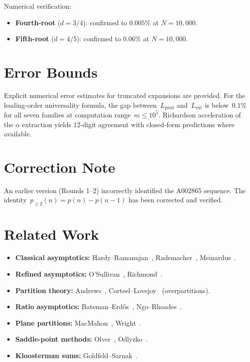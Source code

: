 \documentclass[11pt,a4paper]{article}
\begin{document}
\noindent Numerical verification:
\begin{itemize}
  \item \textbf{Fourth-root} ($d=3/4$): confirmed to $0.005\%$ at $N=10{,}000$.
  \item \textbf{Fifth-root} ($d=4/5$): confirmed to $0.06\%$ at $N=10{,}000$.
\end{itemize}

\section{Error Bounds}\label{sec:errors}

Explicit numerical error estimates for truncated expansions are provided. For the leading-order universality formula, the gap between~$L_{\mathrm{pred}}$ and~$L_{\mathrm{ext}}$ is below~$0.1\%$ for all seven families at computation range~$m \leq 10^5$. Richardson acceleration of the $\alpha$ extraction yields 12-digit agreement with closed-form predictions where available.

\section{Correction Note}\label{sec:correction}

An earlier version (Rounds 1--2) incorrectly identified the A002865 sequence. The identity~$p_{\geq 2}(n) = p(n) - p(n-1)$ has been corrected and verified.

\section{Related Work}\label{sec:related}

\begin{itemize}
  \item \textbf{Classical asymptotics:} Hardy--Ramanujan~\cite{hardy1918}, Rademacher~\cite{rademacher1937}, Meinardus~\cite{meinardus1954}.
  \item \textbf{Refined asymptotics:} O'Sullivan~\cite{osullivan2015}, Richmond~\cite{richmond1975}.
  \item \textbf{Partition theory:} Andrews~\cite{andrews1976}, Corteel--Lovejoy~\cite{corteel2004} (overpartitions).
  \item \textbf{Ratio asymptotics:} Bateman--Erd\H{o}s~\cite{bateman1956}, Ngo--Rhoades~\cite{ngo2017}.
  \item \textbf{Plane partitions:} MacMahon~\cite{macmahon1912}, Wright~\cite{wright1931,wright1934}.
  \item \textbf{Saddle-point methods:} Olver~\cite{olver1974}, Odlyzko~\cite{odlyzko1995}.
  \item \textbf{Kloosterman sums:} Goldfeld--Sarnak~\cite{goldfeld1983}.
\end{itemize}
\end{document}
